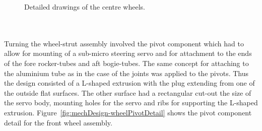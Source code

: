         \begin{figure}[h!]
        \centering
        \qquad
        \caption[Detailed drawings of the centre wheels.]{Detailed drawings of the centre wheels.}
        \label{fig:mechDesign-midWheelDetail}
        \end{figure}
          
      \\\\
        Turning the wheel-strut assembly involved the pivot component which had to allow for mounting of a sub-micro steering servo and for attachment to the ends of the fore rocker-tubes and aft bogie-tubes. The same concept for attaching to the aluminium tube as in the case of the joints was applied to the pivots. Thus the design consisted of a L-shaped extrusion with the plug extending from one of the outside flat surfaces. The other surface had a rectangular cut-out the size of the servo body, mounting holes for the servo and ribs for supporting the L-shaped extrusion. Figure~\ref{fig:mechDesign-wheelPivotDetail} shows the pivot component detail for the front wheel assembly.
        
